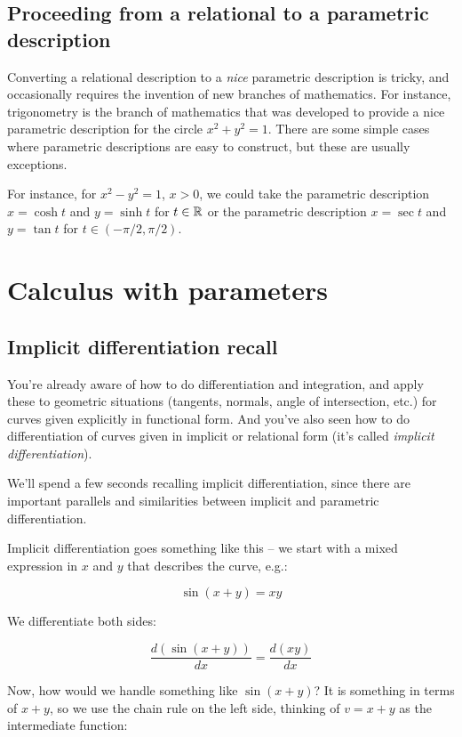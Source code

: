 \documentclass[10pt]{amsart}
\begin{document}
\subsection{Proceeding from a relational to a parametric description}

Converting a relational description to a {\em nice} parametric
description is tricky, and occasionally requires the invention of new
branches of mathematics. For instance, trigonometry is the branch of
mathematics that was developed to provide a nice parametric
description for the circle $x^2 + y^2 = 1$. There are some simple
cases where parametric descriptions are easy to construct, but these
are usually exceptions.

For instance, for $x^2 - y^2 = 1$, $x > 0$, we could take the
parametric description $x = \cosh t$ and $y = \sinh t$ for $t \in
\mathbb{R}$ or the parametric description $x = \sec t$ and $y = \tan t$ for $t
\in (-\pi/2,\pi/2)$.

\section{Calculus with parameters}

\subsection{Implicit differentiation recall}

You're already aware of how to do differentiation and integration, and
apply these to geometric situations (tangents, normals, angle of
intersection, etc.) for curves given explicitly in functional
form. And you've also seen how to do differentiation of curves given
in implicit or relational form (it's called {\em implicit
differentiation}).

We'll spend a few seconds recalling implicit differentiation, since
there are important parallels and similarities between implicit and
parametric differentiation.

Implicit differentiation goes something like this -- we start with a
mixed expression in $x$ and $y$ that describes the curve, e.g.:

$$\sin(x + y) = xy$$

We differentiate both sides:

$$\frac{d(\sin(x + y))}{dx} = \frac{d(xy)}{dx}$$

Now, how would we handle something like $\sin(x + y)$? It is something
in terms of $x + y$, so we use the chain rule on the left side,
thinking of $v = x + y$ as the intermediate function:
\end{document}
